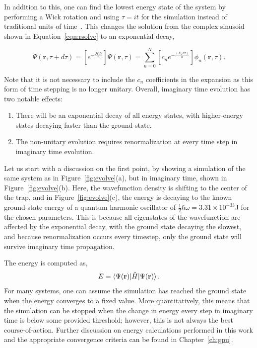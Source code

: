 In addition to this, one can find the lowest energy state of the system by performing a Wick rotation and using $\tau = it$ for the simulation instead of traditional units of time~\cite{wick1954}.
This changes the solution from the complex sinusoid shown in Equation~\eqref{eqn:rsolve} to an exponential decay,

\begin{equation}
\Psi(\mathbf{r},\tau + d\tau) = \left[e^{-\frac{\mathcal{\hat{H}}d\tau}{\hbar}}\right]\Psi(\mathbf{r},\tau) = \sum_{n=0}^N\left[c_n e^{-\frac{(E_n d\tau)}{\hbar}}\right]\phi_n(\mathbf{r},\tau).
\end{equation}

\noindent Note that it is not necessary to include the $c_n$ coefficients in the expansion as this form of time stepping is no longer unitary.
Overall, imaginary time evolution has two notable effects:
\begin{enumerate}
\item There will be an exponential decay of all energy states, with higher-energy states decaying faster than the ground-state.
\item The non-unitary evolution requires renormalization at every time step in imaginary time evolution.
\end{enumerate}
Let us start with a discussion on the first point, by showing a simulation of the same system as in Figure~\ref{fig:evolve}(a), but in imaginary time, shown in Figure~\ref{fig:evolve}(b).
Here, the wavefunction density is shifting to the center of the trap, and
in Figure~\ref{fig:evolve}(c), the energy is decaying to the known ground-state energy of a quantum harmonic oscillator of $\frac{1}{2}\hbar\omega = 3.31\times 10^{-33}$J for the chosen parameters.
This is because all eigenstates of the wavefunction are affected by the exponential decay, with the ground state decaying the slowest, and because renormalization occurs every timestep, only the ground state will survive imaginary time propagation.

The energy is computed as,
\begin{equation}
E = \braket{\Psi(\mathbf{r})|\hat H|\Psi(\mathbf{r})}.
\label{eqn:energy}
\end{equation}
For many systems, one can assume the simulation has reached the ground state when the energy converges to a fixed value.
More quantitatively, this means that the simulation can be stopped when the change in energy every step in imaginary time is below some provided threshold; however, this is not always the best course-of-action.
Further discussion on energy calculations performed in this work and the appropriate convergence criteria can be found in Chapter~\ref{ch:gpu}.

